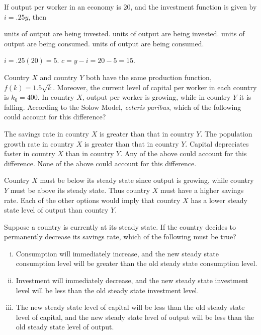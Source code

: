 \documentclass[addpoints,11pt]{exam}
\theoremstyle{definition}
\begin{document}
\begin{questions}
	\question If output per worker in an economy is 20, and the investment function is given by $i = .25y$, then
	
	\begin{choices}
		 units of output are being invested.
		 units of output are being invested.
		 units of output are being consumed.
		 units of output are being consumed.
	\end{choices}
	
	
	\begin{solution}
		$i=.25(20) = 5$. $c = y - i = 20 - 5 = 15$.
	\end{solution}
	
	\question Country $X$ and country $Y$ both have the same production function, $f(k)=1.5\sqrt{k}$. Moreover, the current level of capital per worker in each country is $k_0 = 400$. In country $X$, output per worker is growing, while in country $Y$ it is falling. According to the Solow Model, \textit{ceteris paribus}, which of the following could account for this difference?
	
	\begin{choices}
		\CorrectChoice The savings rate in country $X$ is greater than that in country $Y$.
		\choice The population growth rate in country $X$ is greater than that in country $Y$.
		\choice Capital depreciates faster in country $X$ than in country $Y$.
		\choice Any of the above could account for this difference.
		\choice None of the above could account for this difference.
	\end{choices}
	
	\begin{solution}
		Country $X$ must be below its steady state since output is growing, while country $Y$ must be above its steady state. Thus country $X$ must have a higher savings rate. Each of the other options would imply that country $X$ has a lower steady state level of output than country $Y$.
	\end{solution}
	
	\question Suppose a country is currently at its steady state. If the country decides to permanently decrease its savings rate, which of the following must be true?
	
	
	\begin{enumerate}[i.]
		\item Consumption will immediately increase, and the new steady state consumption level will be greater than the old steady state consumption level.
		\item Investment will immediately decrease, and the new steady state investment level will be less than the old steady state investment level.
		\item The new steady state level of capital will be less than the old steady state level of capital, and the new steady state level of output will be less than the old steady state level of output.
	\end{enumerate}
	

\end{questions}
\end{document}
